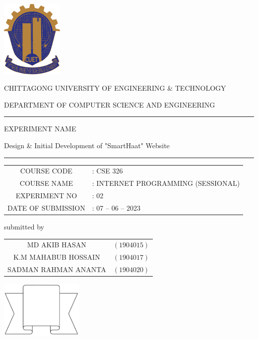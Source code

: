 \documentclass[a4paper,12pt]{report}
\begin{document}
\begin{titlepage}

	\centering

	\includegraphics[width=3cm, keepaspectratio]{cuet.png} \par \vspace{0.5cm}
	\begin{Large}
		CHITTAGONG UNIVERSITY OF ENGINEERING \& TECHNOLOGY
	\end{Large}
	\par
	\vspace{.5cm}
	{DEPARTMENT OF COMPUTER SCIENCE AND ENGINEERING}
\vspace{1cm}

	\raisebox{-\baselineskip}{\rule{\textwidth}{1px}}
	\rule{\textwidth}{1px}
{\Large{{EXPERIMENT NAME}}}\par \vspace{0.5cm}
\huge{{Design \& Initial Development of "SmartHaat" Website}}
	\rule{\textwidth}{2px}

\vspace{0.5cm}

	\normalsize
\begin{tabular}{cl}
	COURSE CODE        & : CSE 326                          \\
	COURSE NAME        & : INTERNET PROGRAMMING (SESSIONAL) \\
	EXPERIMENT NO      & : 02                               \\
	DATE OF SUBMISSION & : 07 -- 06 -- 2023
\end{tabular}
\vspace{0.5cm}

	\parbox[l]{9cm}{
		\begin{center}
			submitted by
		\end{center}

		\begin{tabular}{cl}
			MD AKIB HASAN        & $(1904015)$ \\
			K.M MAHABUB HOSSAIN  & $(1904017)$ \\
			SADMAN RAHMAN ANANTA & $(1904020)$ \\
		\end{tabular}
	}
	\parbox[r]{7cm}{
		\vspace{1cm}
		\begin{center}
			\includegraphics[width=4cm, keepaspectratio]{remarks.png}
		\end{center}
	}


\end{titlepage}
\end{document}
